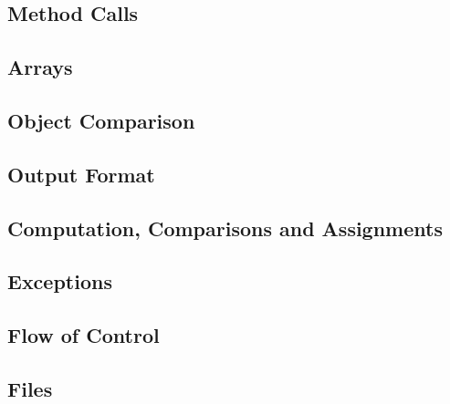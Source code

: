 \documentclass[a4paper,10pt]{article}
\begin{document}
\subsection{Method Calls}
\subsection{Arrays}
\subsection{Object Comparison}
\subsection{Output Format}
\subsection{Computation, Comparisons and Assignments}
\subsection{Exceptions}
\subsection{Flow of Control}
\subsection{Files}
\end{document}
